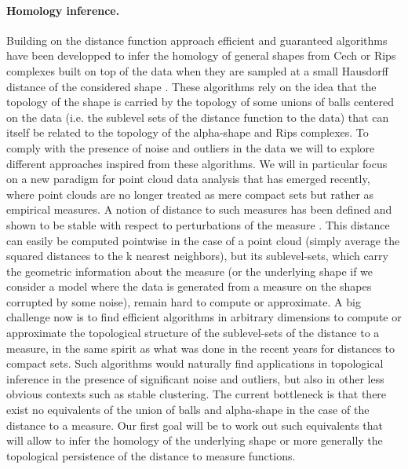

\paragraph{Homology inference.}
Building on the distance function approach efficient and guaranteed algorithms have been developped to infer the homology of general shapes from Cech or Rips complexes built on top of the data   when they are sampled at a small Hausdorff distance of the considered shape \cite{co-tpr-2008}. These algorithms rely on  the idea that the topology of the shape is carried  by the topology of some  unions of balls centered on the data (i.e. the sublevel sets of the distance function to the data)  that can itself be related to the topology of the  alpha-shape and Rips complexes.
To comply with the presence of noise and outliers in the data we will to explore different approaches inspired from these algorithms. 
We will in particular focus on a new paradigm for point cloud data analysis that has emerged recently, where point clouds are no
longer treated as mere compact sets but rather as empirical measures. A notion of distance to
such measures has been defined and shown to be stable with respect to perturbations of the
measure \cite{ccsm-gipm-2011}. This distance can easily be computed pointwise in the case of a point cloud (simply
average the squared distances to the k nearest neighbors), but its sublevel-sets, which carry the
geometric information about the measure (or the underlying shape if we consider a model where the data is generated from a measure on the shapes corrupted by some noise), remain hard to compute or approximate. A big challenge now is to find efficient algorithms in arbitrary dimensions to compute or approximate
the topological structure of the sublevel-sets of the distance to a measure, in the same spirit as
what was done in the recent years for distances to compact sets. Such algorithms would naturally
find applications in topological inference in the presence of significant noise and outliers, but
also in other less obvious contexts such as stable clustering. The current bottleneck is that 
there exist no equivalents of the union of balls and alpha-shape in the case of the distance to
a measure. Our first goal will be to work out such equivalents that will allow to infer the homology of the underlying shape or more generally the topological persistence of the distance to measure functions.

